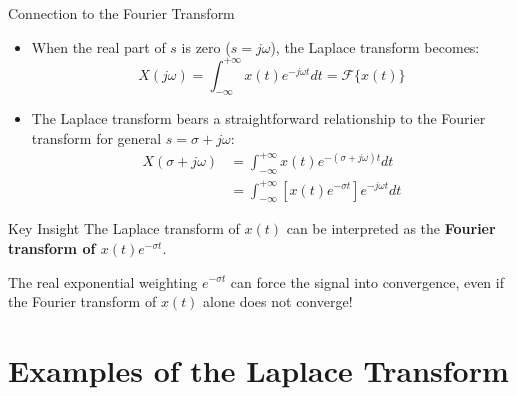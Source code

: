 \begin{frame}{Connection to the Fourier Transform}
    \begin{itemize}
        \item When the real part of $s$ is zero ($s = j\omega$), the Laplace transform becomes:
              \begin{equation*}
                  X(j\omega) = \int_{-\infty}^{+\infty} x(t) e^{-j\omega t} dt = \mathcal{F}\{x(t)\}
              \end{equation*}
        \item The Laplace transform bears a straightforward relationship to the Fourier transform for general $s = \sigma + j\omega$:
              \begin{align*}
                  X(\sigma + j\omega) & = \int_{-\infty}^{+\infty} x(t) e^{-(\sigma+j\omega)t} dt         \\
                                      & = \int_{-\infty}^{+\infty} [x(t) e^{-\sigma t}] e^{-j\omega t} dt
              \end{align*}
    \end{itemize}

    \vspace{0.2cm}
    \begin{insightbox}{Key Insight}
        The Laplace transform of $x(t)$ can be interpreted as the \textbf{Fourier transform of $x(t) e^{-\sigma t}$}.
        \vspace{0.2cm}

        The real exponential weighting $e^{-\sigma t}$ can force the signal into convergence, even if the Fourier transform of $x(t)$ alone does not converge!
    \end{insightbox}
\end{frame}

\section{Examples of the Laplace Transform}

